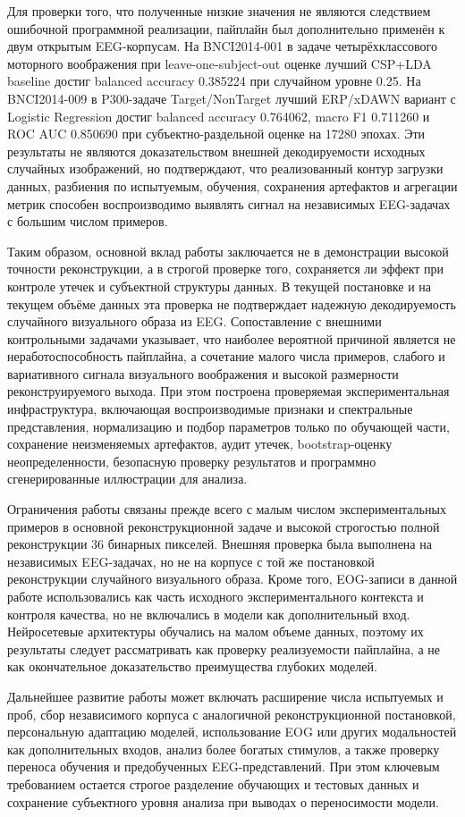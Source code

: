 Для проверки того, что полученные низкие значения не являются следствием
ошибочной программной реализации, пайплайн был дополнительно применён к двум
открытым EEG-корпусам. На BNCI2014-001 в задаче четырёхклассового моторного
воображения при leave-one-subject-out оценке лучший CSP+LDA baseline достиг
balanced accuracy 0.385224 при случайном уровне 0.25. На BNCI2014-009 в
P300-задаче Target/NonTarget лучший ERP/xDAWN вариант с Logistic Regression
достиг balanced accuracy 0.764062, macro F1 0.711260 и ROC AUC 0.850690 при
субъектно-раздельной оценке на 17280 эпохах. Эти результаты не являются
доказательством внешней декодируемости исходных случайных изображений, но
подтверждают, что реализованный контур загрузки данных, разбиения по
испытуемым, обучения, сохранения артефактов и агрегации метрик способен
воспроизводимо выявлять сигнал на независимых EEG-задачах с большим числом
примеров.

Таким образом, основной вклад работы заключается не в демонстрации высокой
точности реконструкции, а в строгой проверке того, сохраняется ли эффект при
контроле утечек и субъектной структуры данных. В текущей постановке и на
текущем объёме данных эта проверка не подтверждает надежную декодируемость
случайного визуального образа из EEG. Сопоставление с внешними контрольными
задачами указывает, что наиболее вероятной причиной является не
неработоспособность пайплайна, а сочетание малого числа примеров, слабого и
вариативного сигнала визуального воображения и высокой размерности
реконструируемого выхода. При этом построена проверяемая экспериментальная
инфраструктура, включающая воспроизводимые признаки и спектральные
представления, нормализацию и подбор параметров только по обучающей части,
сохранение неизменяемых артефактов, аудит утечек, bootstrap-оценку
неопределенности, безопасную проверку результатов и программно сгенерированные
иллюстрации для анализа.

Ограничения работы связаны прежде всего с малым числом экспериментальных
примеров в основной реконструкционной задаче и высокой строгостью полной
реконструкции 36 бинарных пикселей. Внешняя проверка была выполнена на
независимых EEG-задачах, но не на корпусе с той же постановкой реконструкции
случайного визуального образа. Кроме того, EOG-записи в данной работе
использовались как часть исходного экспериментального контекста и контроля
качества, но не включались в модели как дополнительный вход. Нейросетевые
архитектуры обучались на малом объеме данных, поэтому их результаты следует
рассматривать как проверку реализуемости пайплайна, а не как окончательное
доказательство преимущества глубоких моделей.

Дальнейшее развитие работы может включать расширение числа испытуемых и проб,
сбор независимого корпуса с аналогичной реконструкционной постановкой,
персональную адаптацию моделей, использование EOG или других модальностей как
дополнительных входов, анализ более богатых стимулов, а также проверку переноса
обучения и предобученных EEG-представлений. При этом ключевым требованием
остается строгое разделение обучающих и тестовых данных и сохранение
субъектного уровня анализа при выводах о переносимости модели.
